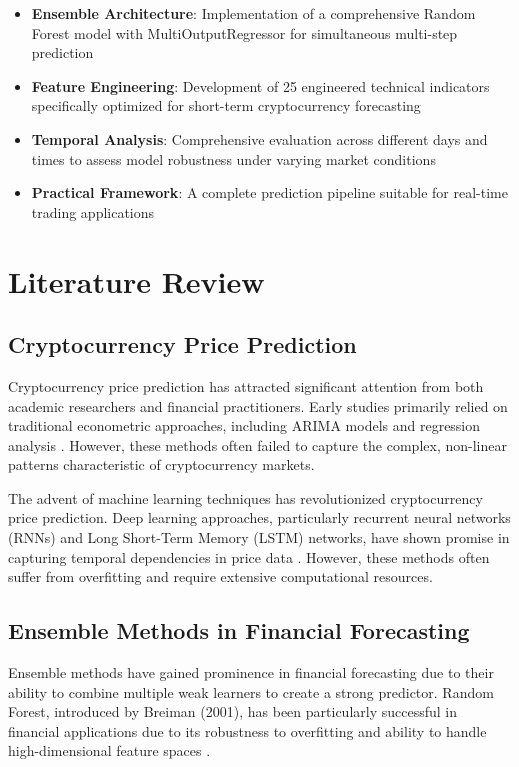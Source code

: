 \documentclass[11pt,a4paper]{article}
\begin{document}
\begin{itemize}
    \item \textbf{Ensemble Architecture}: Implementation of a comprehensive Random Forest model with MultiOutputRegressor for simultaneous multi-step prediction
    \item \textbf{Feature Engineering}: Development of 25 engineered technical indicators specifically optimized for short-term cryptocurrency forecasting
    \item \textbf{Temporal Analysis}: Comprehensive evaluation across different days and times to assess model robustness under varying market conditions
    \item \textbf{Practical Framework}: A complete prediction pipeline suitable for real-time trading applications
\end{itemize}

\section{Literature Review}

\subsection{Cryptocurrency Price Prediction}

Cryptocurrency price prediction has attracted significant attention from both academic researchers and financial practitioners. Early studies primarily relied on traditional econometric approaches, including ARIMA models and regression analysis \cite{katsiampa2017volatility}. However, these methods often failed to capture the complex, non-linear patterns characteristic of cryptocurrency markets.

The advent of machine learning techniques has revolutionized cryptocurrency price prediction. Deep learning approaches, particularly recurrent neural networks (RNNs) and Long Short-Term Memory (LSTM) networks, have shown promise in capturing temporal dependencies in price data \cite{mcnally2018predicting}. However, these methods often suffer from overfitting and require extensive computational resources.

\subsection{Ensemble Methods in Financial Forecasting}

Ensemble methods have gained prominence in financial forecasting due to their ability to combine multiple weak learners to create a strong predictor. Random Forest, introduced by Breiman (2001), has been particularly successful in financial applications due to its robustness to overfitting and ability to handle high-dimensional feature spaces \cite{breiman2001random}.
\end{document}
